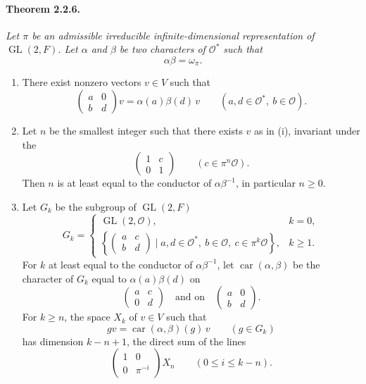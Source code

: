 \documentclass[10pt,a4paper]{article}
\providecommand{\GL}{\operatorname{GL}}
\providecommand{\car}{\operatorname{car}}
\providecommand{\OO}{\mathcal O}
\begin{document}
\paragraph{Theorem 2.2.6.}{\itshape  Let \(\pi\) be an admissible irreducible infinite-dimensional representation of \(\GL(2,F)\). Let \(\alpha\) and \(\beta\) be two characters of \(\OO^*\) such that
\[
\alpha\beta=\omega_\pi.
\]
\begin{enumerate}[label=(\roman*)]
\item There exist nonzero vectors \(v\in V\) such that
\[
\begin{pmatrix}a&0\\b&d\end{pmatrix}v=\alpha(a)\beta(d)\,v
\qquad(a,d\in\OO^*,\ b\in\OO).
\]
\item Let \(n\) be the smallest integer such that there exists \(v\) as in (i), invariant under the
\[
\begin{pmatrix}1&c\\0&1\end{pmatrix}
\qquad(c\in\pi^n\OO).
\]
Then \(n\) is at least equal to the conductor of \(\alpha\beta^{-1}\), in particular \(n\ge0\).
\item Let \(G_k\) be the subgroup of \(\GL(2,F)\)
\[
G_k=
\begin{cases}
\GL(2,\OO),&k=0,\\[0.4em]
\left\{\begin{pmatrix}a&c\\b&d\end{pmatrix}\mid
a,d\in\OO^*,\ b\in\OO,\ c\in\pi^k\OO\right\},&k\ge1.
\end{cases}
\]
For \(k\) at least equal to the conductor of \(\alpha\beta^{-1}\), let \(\car(\alpha,\beta)\) be the character of \(G_k\) equal to \(\alpha(a)\beta(d)\) on
\[
\begin{pmatrix}a&c\\0&d\end{pmatrix}
\quad\text{and on}\quad
\begin{pmatrix}a&0\\b&d\end{pmatrix}.
\]
For \(k\ge n\), the space \(X_k\) of \(v\in V\) such that
\[
gv=\car(\alpha,\beta)(g)\,v\qquad(g\in G_k)
\]
has dimension \(k-n+1\), the direct sum of the lines
\[
\begin{pmatrix}1&0\\0&\pi^{-i}\end{pmatrix}X_n
\qquad(0\le i\le k-n).
\]
\end{enumerate}\par}
\end{document}
